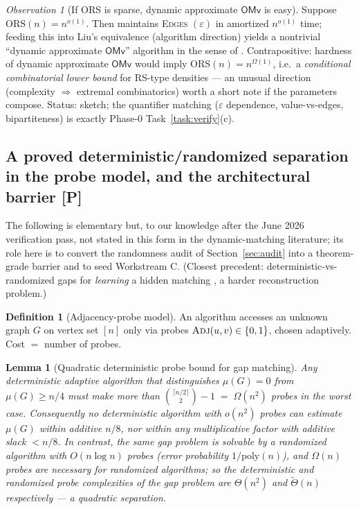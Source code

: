 \documentclass[11pt]{article}
\newtheorem{lemma}[theorem]{Lemma}
\theoremstyle{definition}
\newtheorem{definition}[theorem]{Definition}
\theoremstyle{remark}
\newtheorem{observation}[theorem]{Observation}
\newcommand{\statusP}{\textcolor{blue!60!black}{\textsf{[P]}}}
\newcommand{\ORS}{\mathrm{ORS}}
\newcommand{\poly}{\mathrm{poly}}
\newcommand{\OMv}{\mathsf{OMv}}
\newcommand{\eps}{\varepsilon}
\newcommand{\mm}{\mu}
\begin{document}
\begin{observation}[If ORS is sparse, dynamic approximate $\OMv$ is easy]
\label{obs:compose}
Suppose $\ORS(n)=n^{o(1)}$. Then \cite{AKK25} maintains \textsc{Edges}%
$(\eps)$ in amortized $n^{o(1)}$ time; feeding this into Liu's
equivalence \cite{Liu24} (algorithm direction) yields a nontrivial
``dynamic approximate $\OMv$'' algorithm in the sense of \cite{Liu24}.
Contrapositive: hardness of dynamic approximate $\OMv$ would imply
$\ORS(n)=n^{\Omega(1)}$, i.e.\ a \emph{conditional combinatorial lower
bound} for RS-type densities --- an unusual direction (complexity
$\Rightarrow$ extremal combinatorics) worth a short note if the
parameters compose. Status: sketch; the quantifier matching
($\eps$ dependence, value-vs-edges, bipartiteness) is exactly Phase-0
Task~\ref{task:verify}(c).
\end{observation}

\subsection{A proved deterministic/randomized separation in the probe
model, and the architectural barrier \statusP}
\label{sec:probelemma}

The following is elementary but, to our knowledge after the June 2026
verification pass, not stated in this form in the dynamic-matching
literature; its role here is to convert the randomness audit of
Section~\ref{sec:audit} into a theorem-grade barrier and to seed
Workstream C. (Closest precedent: deterministic-vs-randomized gaps for
\emph{learning} a hidden matching \cite{ABKRS04}, a harder
reconstruction problem.)

\begin{definition}[Adjacency-probe model]
An algorithm accesses an unknown graph $G$ on vertex set $[n]$ only via
probes $\textsc{Adj}(u,v)\in\{0,1\}$, chosen adaptively. Cost $=$ number
of probes.
\end{definition}

\begin{lemma}[Quadratic deterministic probe bound for gap matching]
\label{lem:probe}
Any deterministic adaptive algorithm that distinguishes
$\mm(G)=0$ from $\mm(G)\ge n/4$ must make more than
$\binom{\lceil n/2\rceil}{2}-1 \;=\;\Omega(n^2)$ probes in the worst
case. Consequently no deterministic algorithm with $o(n^2)$ probes can
estimate $\mm(G)$ within additive $n/8$, nor within any multiplicative
factor with additive slack $<n/8$. In contrast, the same gap problem is
solvable by a randomized algorithm with $O(n\log n)$ probes (error
probability $1/\poly(n)$), and $\Omega(n)$ probes are necessary for
randomized algorithms; so the deterministic and randomized probe
complexities of the gap problem are $\Theta(n^2)$ and
$\widetilde{\Theta}(n)$ respectively --- a quadratic separation.
\end{lemma}
\end{document}
